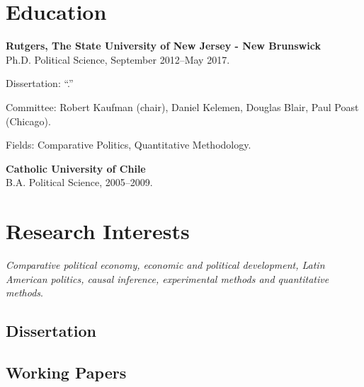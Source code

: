 \documentclass[letterpaper]{article}
\renewenvironment{itemize}{
  \begin{list}{}{
    \setlength{\leftmargin}{1.5em}
  }
}{
  \end{list}
}
\begin{document}
\section*{Education}

\begin{itemize}
  \item {\bf Rutgers, The State University of New Jersey - New Brunswick}\\
  Ph.D. Political Science, September 2012--May 2017.
    	\begin{itemize}
      		\item[] Dissertation: ``{\unskip}.''
      		\item[] Committee: Robert Kaufman (chair), Daniel Kelemen, Douglas Blair, Paul Poast (Chicago).
          \item[] Fields: Comparative Politics, Quantitative Methodology.
		  \end{itemize}

\item {\bf Catholic University of Chile}\\
B.A. Political Science, 2005--2009.
\end{itemize}


\section*{Research Interests}

\emph{Comparative political economy, economic and political development, Latin American politics, causal inference, experimental methods and quantitative methods}.

\subsection*{Dissertation}

{\unskip}



\subsection*{Working Papers}
\end{document}
